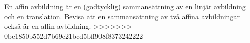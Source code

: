 \documentclass{article}
\begin{document}
\section{}
En affin avbildning är en (godtycklig) sammansättning av en linjär avbildning och en
translation. Bevisa att en sammansättning av två affina avbildningar också är en affin avbildning.
>>>>>>> 0be1850b552d7b69e21bcd5bff908f8373242222
\end{document}
